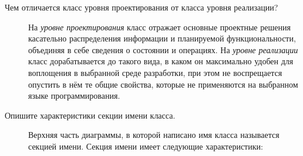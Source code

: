 \begin{description}
	\item [Чем отличается класс уровня проектирования от класса
		уровня реализации?]
		На \textit{уровне проектирования} класс отражает основные проектные
		решения касательно распределения информации и планируемой
		функциональности, объединяя в себе сведения о состоянии и операциях.
		На \textit{уровне реализации} класс дорабатывается до такого вида,
		в каком он максимально удобен для воплощения в выбранной среде
		разработки,
		при этом не воспрещается опустить в нём те общие свойства,
		которые не применяются на выбранном языке программирования.
	\item [Опишите характеристики секции имени класса.]
		Верхняя часть диаграммы, в которой написано имя класса
		называется секцией имени. Секция имени имеет следующие
		характеристики:


\end{description}
